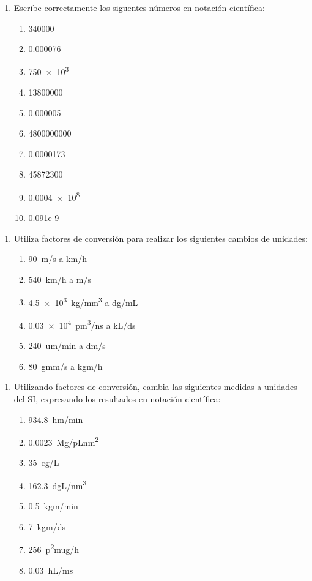 \documentclass[
]{article}
\begin{document}
\begin{enumerate}
\def\labelenumi{\arabic{enumi}.}
\item
  Escribe correctamente los siguentes números en notación científica:

  \begin{enumerate}
  \def\labelenumii{\arabic{enumii}.}
  \item
    340000
  \item
    0.000076
  \item
    750~×~10\textsuperscript{3}
  \item
    13800000
  \item
    0.000005
  \item
    4800000000
  \item
    0.0000173
  \item
    45872300
  \item
    0.0004~×~10\textsuperscript{8}
  \item
    0.091e-9
  \end{enumerate}
\end{enumerate}

\begin{enumerate}
\def\labelenumi{\arabic{enumi}.}
\item
  Utiliza factores de conversión para realizar los siguientes cambios de
  unidades:

  \begin{enumerate}
  \def\labelenumii{\arabic{enumii}.}
  \item
    90~m/s a km/h
  \item
    540~km/h a m/s
  \item
    4.5~×~10\textsuperscript{3}~kg/mm\textsuperscript{3} a dg/mL
  \item
    0.03~×~10\textsuperscript{4}~pm\textsuperscript{3}/ns a kL/ds
  \item
    240~um/min a dm/s
  \item
    80~gmm/s a kgm/h
  \end{enumerate}
\end{enumerate}

\begin{enumerate}
\def\labelenumi{\arabic{enumi}.}
\item
  Utilizando factores de conversión, cambia las siguientes medidas a
  unidades del SI, expresando los resultados en notación científica:

  \begin{enumerate}
  \def\labelenumii{\arabic{enumii}.}
  \item
    934.8~hm/min
  \item
    0.0023~Mg/pLnm\textsuperscript{2}
  \item
    35~cg/L
  \item
    162.3~dgL/nm\textsuperscript{3}
  \item
    0.5~kgm/min
  \item
    7~kgm/ds
  \item
    256~p\textsuperscript{2}mug/h
  \item
    0.03~hL/ms
  \end{enumerate}
\end{enumerate}
\end{document}
